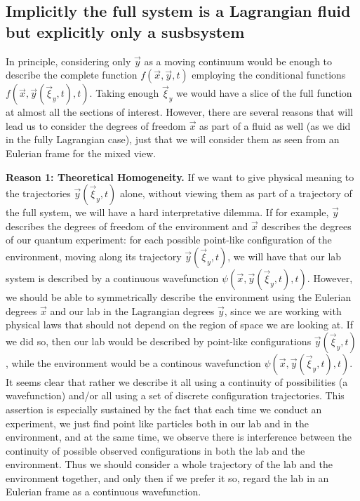 \documentclass[11pt, a4paper]{article} %
\begin{document}
\subsection*{Implicitly the full system is a Lagrangian fluid but explicitly only a susbsystem\vspace{-0.2cm}}
In principle, considering only $\vec{y}$ as a moving continuum would be enough to describe the complete function $f(\vec{x},\vec{y},t)$ employing the conditional functions $f(\vec{x},\vec{y}(\vec{\xi}_y,t),t)$. Taking enough $\vec{\xi}_y$ we would have a slice of the full function at almost all the sections of interest. However, there are several reasons that will lead us to consider the degrees of freedom $\vec{x}$ as part of a fluid as well (as we did in the fully Lagrangian case), just that we will consider them as seen from an Eulerian frame for the mixed view.

{\bf Reason 1: Theoretical Homogeneity.} If we want to give physical meaning to the trajectories $\vec{y}(\vec{\xi}_y,t)$ alone, without viewing them as part of a trajectory of the full system, we will have a hard interpretative dilemma. If for example, $\vec{y}$ describes the degrees of freedom of the environment and $\vec{x}$ describes the degrees of our quantum experiment: for each possible point-like configuration of the environment, moving along its trajectory $\vec{y}(\vec{\xi}_y,t)$, we will have that our lab system is described by a continuous wavefunction $\psi(\vec{x},\vec{y}(\vec{\xi}_y,t),t)$. However, we should be able to symmetrically describe the environment using the Eulerian degrees $\vec{x}$ and our lab in the Lagrangian degrees $\vec{y}$, since we are working with physical laws that should not depend on the region of space we are looking at. If we did so, then our lab would be described by point-like configurations $\vec{y}(\vec{\xi}_y,t)$, while the environment would be a continous wavefunction $\psi(\vec{x},\vec{y}(\vec{\xi}_y,t),t)$. It seems clear that rather we describe it all using a continuity of possibilities (a wavefunction) and/or all using a set of discrete configuration trajectories. This assertion is especially sustained by the fact that each time we conduct an experiment, we just find point like particles both in our lab and in the environment, and at the same time, we observe there is interference between the continuity of possible observed configurations in both the lab and the environment. Thus we should consider a whole trajectory of the lab and the environment together, and only then if we prefer it so, regard the lab in an Eulerian frame as a continuous wavefunction.
\end{document}
